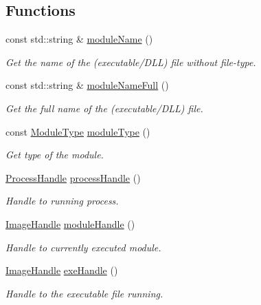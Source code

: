 \subsection*{Functions}
\begin{DoxyCompactItemize}
\item 
const std\+::string \& \hyperlink{namespaceSystem_add155d288552032434ee9e25d130ad72}{module\+Name} ()
\begin{DoxyCompactList}\small\item\em Get the name of the (executable/\+D\+LL) file without file-\/type. \end{DoxyCompactList}\item 
const std\+::string \& \hyperlink{namespaceSystem_abbb9e2ab2f883bfe24805d89bef43792}{module\+Name\+Full} ()
\begin{DoxyCompactList}\small\item\em Get the full name of the (executable/\+D\+LL) file. \end{DoxyCompactList}\item 
const \hyperlink{namespaceSystem_a12d36cf455e22c1e75ef65a2105df4c5}{Module\+Type} \hyperlink{namespaceSystem_aa0cb1193baa6883c2686a0a87d56d228}{module\+Type} ()
\begin{DoxyCompactList}\small\item\em Get type of the module. \end{DoxyCompactList}\item 
\hyperlink{namespaceSystem_a7490ee4911e28ad26aa0fcdd00a629df}{Process\+Handle} \hyperlink{namespaceSystem_a563f947d4a2921f4348ff4f8e909a9f2}{process\+Handle} ()
\begin{DoxyCompactList}\small\item\em Handle to running process. \end{DoxyCompactList}\item 
\hyperlink{namespaceSystem_a21dca3f6170a2b0a0ea3028040ba21b3}{Image\+Handle} \hyperlink{namespaceSystem_ab88d0de1d6850b6f95522e9c242eeab0}{module\+Handle} ()
\begin{DoxyCompactList}\small\item\em Handle to currently executed module. \end{DoxyCompactList}\item 
\hyperlink{namespaceSystem_a21dca3f6170a2b0a0ea3028040ba21b3}{Image\+Handle} \hyperlink{namespaceSystem_a89399871d8d0f573f39f97f7f4a6320b}{exe\+Handle} ()
\begin{DoxyCompactList}\small\item\em Handle to the executable file running. \end{DoxyCompactList}\item 

\end{DoxyCompactItemize}
